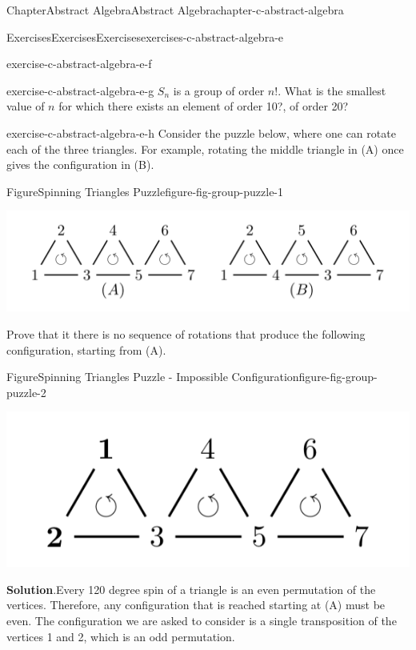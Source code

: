 \documentclass[oneside,10pt,]{book}
\newcommand{\blocktitlefont}{\relax}
\numberwithin{equation}{section}
\begin{document}
\begin{chapterptx}{Chapter}{Abstract Algebra}{}{Abstract Algebra}{}{}{chapter-c-abstract-algebra}
\begin{exercises-section}{Exercises}{Exercises}{}{Exercises}{}{}{exercises-c-abstract-algebra-e}
\begin{divisionexercise}{5}{}{}{exercise-c-abstract-algebra-e-f}
\end{divisionexercise}%
\begin{divisionexercise}{6}{}{}{exercise-c-abstract-algebra-e-g}%
\(S_n\) is a group of order \(n!\).  What is the smallest value of \(n\) for which there exists an element of order 10?, of order 20?%
\end{divisionexercise}%
\begin{divisionexercise}{7}{}{}{exercise-c-abstract-algebra-e-h}%
Consider the puzzle below, where one can rotate each of the three triangles. For example, rotating the middle triangle in (A) once gives the configuration in (B).%
\begin{figureptx}{Figure}{Spinning Triangles Puzzle}{figure-fig-group-puzzle-1}{}%
\begin{image}{0}{1}{0}%
\includegraphics[width=\linewidth]{images/fig-group-puzzle-1.png}
\end{image}%
\tcblower
\end{figureptx}%
Prove that it there is no sequence of rotations that produce the following configuration, starting from (A).%
\begin{figureptx}{Figure}{Spinning Triangles Puzzle - Impossible Configuration}{figure-fig-group-puzzle-2}{}%
\begin{image}{0}{1}{0}%
\includegraphics[width=\linewidth]{images/fig-group-puzzle-2.png}
\end{image}%
\tcblower
\end{figureptx}%
\par\smallskip%
\noindent\textbf{\blocktitlefont Solution}.\hypertarget{solution-c-abstract-algebra-e-h-b}{}\quad{}Every 120 degree spin of a triangle is an even permutation of the vertices. Therefore, any configuration that is reached starting at (A) must be even.  The configuration we are asked to consider is a single transposition of the vertices 1 and 2, which is an odd permutation.%
\end{divisionexercise}%
\end{exercises-section}
\end{chapterptx}
\end{document}
